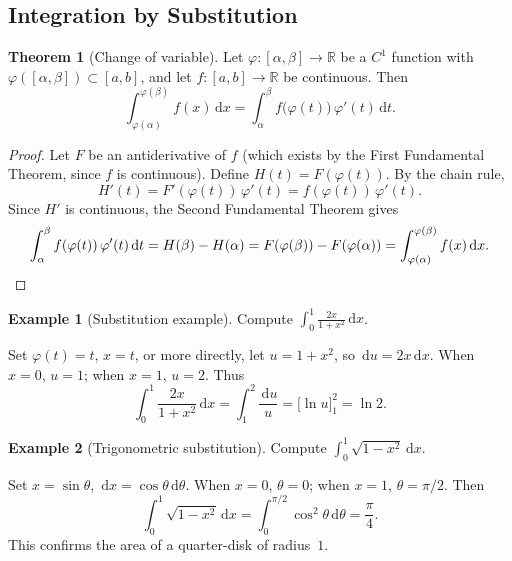 \documentclass[12pt,a4paper]{book}
\theoremstyle{definition}
\newtheorem{theorem}{Theorem}[chapter]
\newtheorem{example}{Example}[chapter]
\newcommand{\R}{\mathbb{R}}
\newcommand{\dd}{\,\mathrm{d}}
\begin{document}
\subsection{Integration by Substitution}\label{subsec:substitution}

\begin{theorem}[Change of variable]\label{thm:substitution}
  Let $\varphi\colon[\alpha,\beta]\to\R$ be a $C^1$ function with
  $\varphi([\alpha,\beta])\subset[a,b]$, and let $f\colon[a,b]\to\R$ be
  continuous.  Then
  \[
    \int_{\varphi(\alpha)}^{\varphi(\beta)} f(x)\dd x
    = \int_\alpha^\beta f\bigl(\varphi(t)\bigr)\,\varphi'(t)\dd t.
  \]
\end{theorem}

\begin{proof}
  Let $F$ be an antiderivative of $f$ (which exists by the First
  Fundamental Theorem, since $f$ is continuous).  Define
  $H(t)=F(\varphi(t))$.  By the chain rule,
  \[
    H'(t) = F'(\varphi(t))\,\varphi'(t) = f(\varphi(t))\,\varphi'(t).
  \]
  Since $H'$ is continuous, the Second Fundamental Theorem gives
  \[
    \int_\alpha^\beta f(\varphi(t))\,\varphi'(t)\dd t
    = H(\beta)-H(\alpha)
    = F(\varphi(\beta))-F(\varphi(\alpha))
    = \int_{\varphi(\alpha)}^{\varphi(\beta)} f(x)\dd x. \qedhere
  \]
\end{proof}

\begin{example}[Substitution example]\label{ex:subst-example1}
  Compute $\displaystyle\int_0^1 \frac{2x}{1+x^2}\dd x$.

  Set $\varphi(t)=t$, $x=t$, or more directly, let $u=1+x^2$, so
  $\dd u=2x\dd x$.  When $x=0$, $u=1$; when $x=1$, $u=2$.  Thus
  \[
    \int_0^1 \frac{2x}{1+x^2}\dd x
    = \int_1^2 \frac{\dd u}{u}
    = \bigl[\ln u\bigr]_1^2 = \ln 2.
  \]
\end{example}

\begin{example}[Trigonometric substitution]\label{ex:subst-trig}
  Compute $\displaystyle\int_0^1 \sqrt{1-x^2}\dd x$.

  Set $x=\sin\theta$, $\dd x=\cos\theta\dd\theta$.  When $x=0$,
  $\theta=0$; when $x=1$, $\theta=\pi/2$.  Then
  \[
    \int_0^1\sqrt{1-x^2}\dd x
    = \int_0^{\pi/2}\cos^2\theta\dd\theta
    = \frac{\pi}{4}.
  \]
  This confirms the area of a quarter-disk of radius~$1$.
\end{example}


\end{document}
